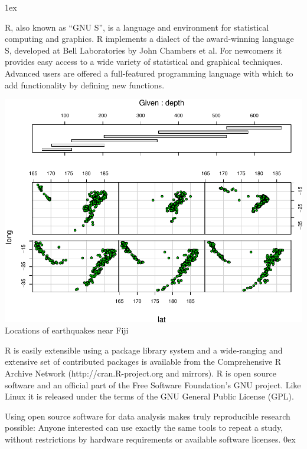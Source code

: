 \documentclass[landscape]{article}
\newlength{\colw}
\newcommand{\column}[1]{\hspace*{9mm}{}
  \parbox[t][0.99\textheight][t]{\colw}{\parskip1ex
    #1\parskip0ex}\hspace{9mm}{}}
\begin{document}
\newpage
\noindent
\column{
  R, also known as ``GNU S'', is a language and environment for
  statistical computing and graphics. R implements a dialect of the
  award-winning language S, developed at Bell Laboratories by John
  Chambers et al. For newcomers it provides easy access to a wide
  variety of statistical and graphical techniques. Advanced users are
  offered a full-featured programming language with which to add
  functionality by defining new functions.

  \begin{center}\footnotesize\sf
    \includegraphics[width=\colw]{quakes-coplot}
    Locations of earthquakes near Fiji
  \end{center}

  R is easily extensible using a package library system and a
  wide-ranging and extensive set of contributed packages is available
  from the Comprehensive R Archive Network (http://cran.R-project.org
  and mirrors).  R is open source software and an official part of the
  Free Software Foundation's GNU project. Like Linux it is released
  under the terms of the GNU General Public License (GPL).

  Using open source software for data analysis makes truly
  reproducible research possible: Anyone interested can use exactly
  the same tools to repeat a study, without restrictions by
  hardware requirements or available software licenses.
  }
\end{document}
